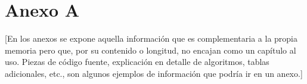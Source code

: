 \chapter{Anexo A}\label{cap:anexoA}

[En los anexos se expone aquella información que es complementaria a la propia memoria pero que, por su contenido o longitud, no encajan como un capítulo al uso. Piezas de código fuente, explicación en detalle de algoritmos, tablas adicionales, etc., son algunos ejemplos de información que podría ir en un anexo.]
